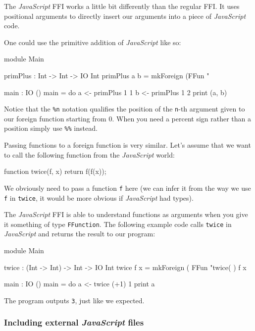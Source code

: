 \noindent
The \emph{JavaScript} FFI works a little bit differently than the regular FFI.
It uses positional arguments to directly insert our arguments into a piece of \emph{JavaScript} code.

\noindent
One could use the primitive addition of \emph{JavaScript} like so:

\begin{code}
module Main

primPlus : Int -> Int -> IO Int
primPlus a b = mkForeign (FFun "%

main : IO ()
main = do
  a <- primPlus 1 1
  b <- primPlus 1 2
  print (a, b)
\end{code}

\noindent
Notice that the \texttt{\%n} notation qualifies the position of the \texttt{n}-th argument given to our foreign function starting from 0.
When you need a percent sign rather than a position simply use \texttt{\%\%} instead.

\noindent
Passing functions to a foreign function is very similar.
Let's assume that we want to call the following function from the \emph{JavaScript} world:

\begin{code}[language=c]
function twice(f, x) {
  return f(f(x));
}
\end{code}

\noindent
We obviously need to pass a function \texttt{f} here (we can infer it from the way we use \texttt{f} in \texttt{twice}, it would be more obvious if \emph{JavaScript} had types).

\noindent
The \emph{JavaScript} FFI is able to understand functions as arguments when you give it something of type \texttt{FFunction}.
The following example code calls \texttt{twice} in \emph{JavaScript} and returns the result to our \Idris{} program:

\begin{code}
module Main

twice : (Int -> Int) -> Int -> IO Int
twice f x = mkForeign (
  FFun "twice(%
) f x

main : IO ()
main = do
  a <- twice (+1) 1
  print a
\end{code}

\noindent
The program outputs \texttt{3}, just like we expected.

\subsubsection*{Including external \emph{JavaScript} files}

